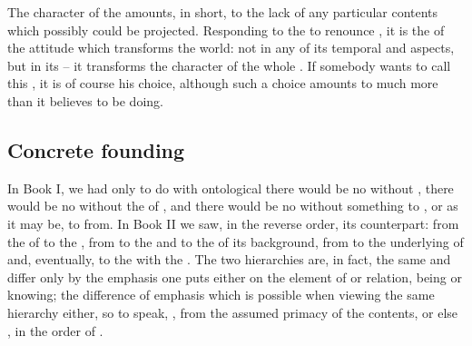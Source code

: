 The  character of the  amounts, in short, to the lack of
any particular contents which possibly could be projected.  Responding to the
 to renounce , it is the  of the attitude
which transforms the world: not in any of its temporal and  aspects,
but in its  -- it transforms the character of the whole
.  If somebody wants to call this , it is of course
his choice, although such a choice amounts to much more than it believes to be
doing.


\subsection{Concrete founding}\label{sub:concrete}

\pa In Book I, we had only to do with ontological  there would be
no  without , there would be no 
without the  of , and there would be no
 without something to , or as it may be, to
 from.
%
In Book II we saw, in the reverse order, its  counterpart:
from the  of  to the , from  to the  and to the
 of its  background, from  to the
underlying  of  and, eventually, to the
 with the .
The two hierarchies are, in fact, the same and differ only by the emphasis one
puts either on the element of  or relation, being or knowing;
the difference of emphasis which is possible when viewing the same hierarchy
either, so to speak, , from the assumed primacy of the
 contents, or else , in the order of
.

